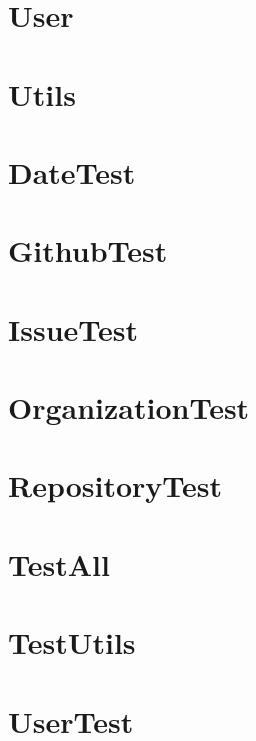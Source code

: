 \documentclass{article}
\begin{document}
\section{User}

\section{Utils}

\section{DateTest}

\section{GithubTest}

\section{IssueTest}

\section{OrganizationTest}

\section{RepositoryTest}

\section{TestAll}

\section{TestUtils}

\section{UserTest}

\end{document}
